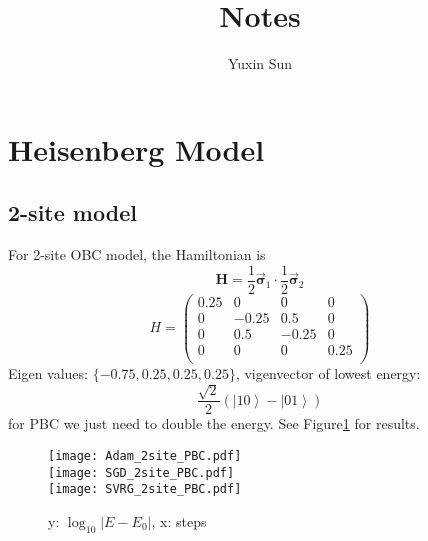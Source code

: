 \documentclass{article}
\title{Notes}
\author{Yuxin Sun}
\newcommand{\ket}[1]{\left\lvert #1\right\rangle}
\begin{document}
\maketitle

\section*{Heisenberg Model}
\subsection*{2-site model}
For 2-site OBC model, the Hamiltonian is 
\[
    \mathbf{H} = \frac12\vec{\mathbf{\sigma}}_1 \cdot \frac12\vec{\mathbf{\sigma}}_2
\]
\[
    H = \begin{pmatrix}
        0.25 & 0 & 0  & 0\\
        0 &-0.25 &0.5 & 0\\
        0 & 0.5  &-0.25&0\\
        0 & 0 & 0 & 0.25\\
    \end{pmatrix}
\]
Eigen values: $\{-0.75, 0.25, 0.25, 0.25\}$, vigenvector of lowest energy:
\[
    \frac{\sqrt{2}}{2}\left(\ket{10} - \ket{01}\right)
\]
for PBC we just need to double the energy.
See Figure\ref{fig:site2} for results.
\begin{figure}[!ht]
	\centering
    \texttt{[image: Adam\_2site\_PBC.pdf]}\\
    \texttt{[image: SGD\_2site\_PBC.pdf]}\\
    \texttt{[image: SVRG\_2site\_PBC.pdf]}
	\caption{y: $\log_{10}\lvert E-E_0 \rvert$, x: steps}
    \label{fig:site2}
\end{figure}
\end{document}
